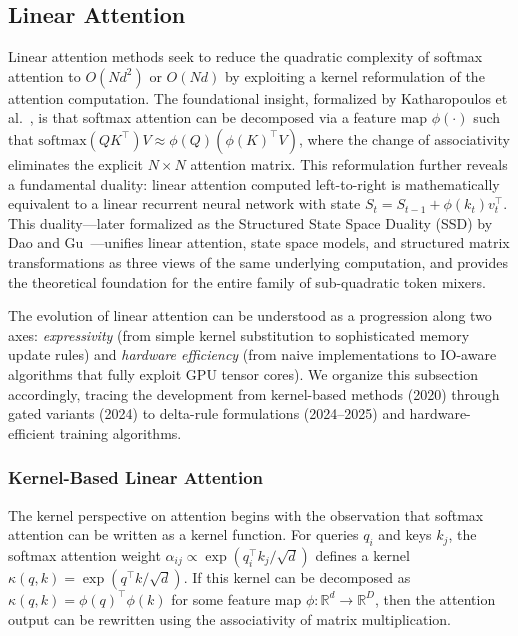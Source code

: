 \subsection{Linear Attention}
\label{subsec:linear-attn}

Linear attention methods seek to reduce the quadratic complexity of softmax attention to $O(Nd^2)$ or $O(Nd)$ by exploiting a kernel reformulation of the attention computation. The foundational insight, formalized by Katharopoulos et al.~\cite{katharopoulos2020transformers}, is that softmax attention can be decomposed via a feature map $\phi(\cdot)$ such that $\text{softmax}(QK^\top)V \approx \phi(Q)(\phi(K)^\top V)$, where the change of associativity eliminates the explicit $N \times N$ attention matrix. This reformulation further reveals a fundamental duality: linear attention computed left-to-right is mathematically equivalent to a linear recurrent neural network with state $S_t = S_{t-1} + \phi(k_t)v_t^\top$. This duality---later formalized as the Structured State Space Duality (SSD) by Dao and Gu~\cite{dao2024transformers}---unifies linear attention, state space models, and structured matrix transformations as three views of the same underlying computation, and provides the theoretical foundation for the entire family of sub-quadratic token mixers.

The evolution of linear attention can be understood as a progression along two axes: \emph{expressivity} (from simple kernel substitution to sophisticated memory update rules) and \emph{hardware efficiency} (from naive implementations to IO-aware algorithms that fully exploit GPU tensor cores). We organize this subsection accordingly, tracing the development from kernel-based methods (2020) through gated variants (2024) to delta-rule formulations (2024--2025) and hardware-efficient training algorithms.

\subsubsection{Kernel-Based Linear Attention}
\label{subsubsec:kernel-linear}

The kernel perspective on attention begins with the observation that softmax attention can be written as a kernel function. For queries $q_i$ and keys $k_j$, the softmax attention weight $\alpha_{ij} \propto \exp(q_i^\top k_j / \sqrt{d})$ defines a kernel $\kappa(q, k) = \exp(q^\top k / \sqrt{d})$. If this kernel can be decomposed as $\kappa(q, k) = \phi(q)^\top \phi(k)$ for some feature map $\phi: \mathbb{R}^d \to \mathbb{R}^D$, then the attention output can be rewritten using the associativity of matrix multiplication.

